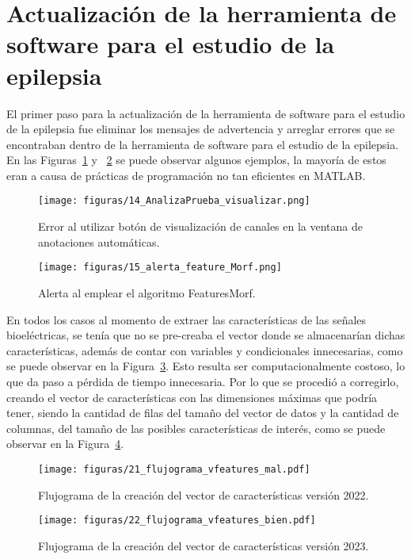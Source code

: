 \section{Actualización de la herramienta de software para el estudio de la epilepsia}
El primer paso para la actualización de la herramienta de software para el estudio de la epilepsia fue eliminar los mensajes de advertencia y arreglar errores que se encontraban dentro de la herramienta de software para el estudio de la epilepsia. En las Figuras~\ref{fig:yo_error_uno} y ~\ref{fig:yo_warning_uno} se puede observar algunos ejemplos, la mayoría de estos eran a causa de prácticas de programación no tan eficientes en MATLAB. 

\begin{figure}[t]
    \centering
    \texttt{[image: figuras/14\_AnalizaPrueba\_visualizar.png]}
    \caption{Error al utilizar botón de visualización de canales en la ventana de anotaciones automáticas.}
    \label{fig:yo_error_uno}
\end{figure}

\begin{figure}[t]
    \centering
    \texttt{[image: figuras/15\_alerta\_feature\_Morf.png]}
    \caption{Alerta al emplear el algoritmo FeaturesMorf.}
    \label{fig:yo_warning_uno}
\end{figure}

En todos los casos al momento de extraer las características de las señales bioeléctricas, se tenía que no se pre-creaba el vector donde se almacenarían dichas características, además de contar con variables y condicionales innecesarias, como se puede observar en la Figura~\ref{flu:vfeatures malo}. Esto resulta ser computacionalmente costoso, lo que da paso a pérdida de tiempo innecesaria. Por lo que se procedió a corregirlo, creando el vector de características con las dimensiones máximas que podría tener, siendo la cantidad de filas del tamaño del vector de datos y la cantidad de columnas, del tamaño de las posibles características de interés, como se puede observar en la Figura~\ref{flu:vfeatures bueno}.

\begin{figure}[H]
    \centering
    \texttt{[image: figuras/21\_flujograma\_vfeatures\_mal.pdf]}
    \caption{Flujograma de la creación del vector de características versión 2022.}
    \label{flu:vfeatures malo}
\end{figure}

\begin{figure}[H]
    \centering
    \texttt{[image: figuras/22\_flujograma\_vfeatures\_bien.pdf]}
    \caption{Flujograma de la creación del vector de características versión 2023.}
    \label{flu:vfeatures bueno}
\end{figure}

